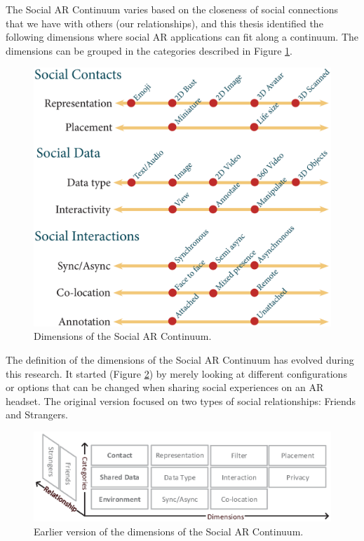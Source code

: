 The Social AR Continuum varies based on the closeness of social connections that we have with others (our relationships), and this thesis identified the following dimensions where social AR applications can fit along a continuum. The dimensions can be grouped in the categories described in Figure \ref{fig:continuum:dimensions}.

\begin{figure}[ht]
    \centering
    \includegraphics[width=.9\linewidth]{images/30-continuum/continuum43-01.eps}
    \caption{Dimensions of the Social AR Continuum.}
    \label{fig:continuum:dimensions}
\end{figure}

The definition of the dimensions of the Social AR Continuum has evolved during this research. It started (Figure \ref{fig:continuum:old-dimensions}) by merely looking at different configurations or options that can be changed when sharing social experiences on an AR headset. The original version focused on two types of social relationships: Friends and Strangers.

\begin{figure}[ht]
    \centering
    \includegraphics[width=.9\linewidth]{images/30-continuum/original-dimensions-diagram.eps}
    \caption{Earlier version of the dimensions of the Social AR Continuum.}
    \label{fig:continuum:old-dimensions}
\end{figure}

